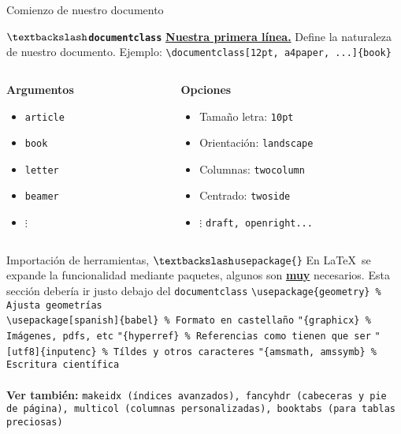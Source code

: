 \documentclass[12pt]{beamer}
\begin{document}
\begin{frame}[fragile]{Comienzo de nuestro documento}
	\begin{block}{\textbf{\texttt{$\textbackslash$documentclass}}}
		\underline{\textbf{Nuestra primera línea.}} Define la naturaleza de nuestro documento. Ejemplo:  \verb|\documentclass[12pt, a4paper, ...]{book}|
	\end{block}
	\begin{columns}
		\begin{column}{0.5\textwidth}
			\textbf{Argumentos}
			\begin{itemize}
				\item \texttt{article}
				\item \texttt{book}
				\item \texttt{letter}
				\item \texttt{beamer}
				\item $\vdots$
			\end{itemize}
		\end{column}
		\begin{column}{0.5\textwidth}
			\textbf{Opciones}
			\begin{itemize}
				\item Tamaño letra: \texttt{10pt}
				\item Orientación: \texttt{landscape}
				\item Columnas: \texttt{twocolumn}
				\item Centrado: \texttt{twoside}
				\item $\vdots$ \texttt{draft, openright...}
			\end{itemize}
		\end{column}
	\end{columns}
\end{frame}

\begin{frame}[fragile]{Importación de herramientas, $\textbackslash$\texttt{usepackage\{\}}}
	En \LaTeX\ se expande la funcionalidad mediante paquetes, algunos son \textbf{\underline{muy}} necesarios. Esta sección debería ir justo debajo del \texttt{documentclass}
	\verb|\usepackage{geometry} % Ajusta geometrías| \\
	\verb|\usepackage[spanish]{babel} % Formato en castellaño|
	\verb|"{graphicx} % Imágenes, pdfs, etc|
	\verb|"{hyperref} % Referencias como tienen que ser|
	\verb|"[utf8]{inputenc} % Tíldes y otros caracteres|
	\verb|"{amsmath, amssymb} % Escritura científica| \\
	\hrulefill\\
	\textbf{Ver también:} \texttt{makeidx (índices avanzados), fancyhdr (cabeceras y pie de página), multicol (columnas personalizadas), booktabs (para tablas preciosas)}
\end{frame}
\end{document}
